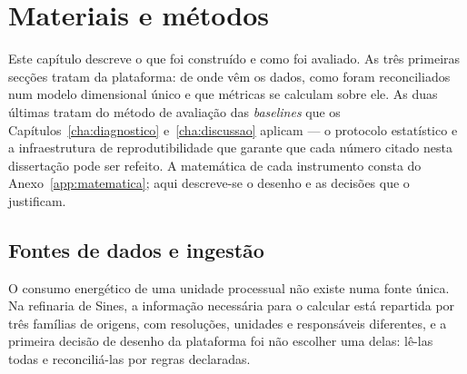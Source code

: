 
\chapter{Materiais e métodos}
\label{cha:metodos}

Este capítulo descreve o que foi construído e como foi avaliado. As três
primeiras secções tratam da plataforma: de onde vêm os dados, como foram
reconciliados num modelo dimensional único e que métricas se calculam sobre
ele. As duas últimas tratam do método de avaliação das \emph{baselines} que
os Capítulos~\ref{cha:diagnostico} e~\ref{cha:discussao} aplicam --- o
protocolo estatístico e a infraestrutura de reprodutibilidade que garante
que cada número citado nesta dissertação pode ser refeito. A matemática de
cada instrumento consta do Anexo~\ref{app:matematica}; aqui descreve-se o
desenho e as decisões que o justificam.

\section{Fontes de dados e ingestão}
\label{sec:fontes}

O consumo energético de uma unidade processual não existe numa fonte
única. Na refinaria de Sines, a informação necessária para o calcular está
repartida por três famílias de origens, com resoluções, unidades e
responsáveis diferentes, e a primeira decisão de desenho da plataforma foi
não escolher uma delas: lê-las todas e reconciliá-las por regras
declaradas.

